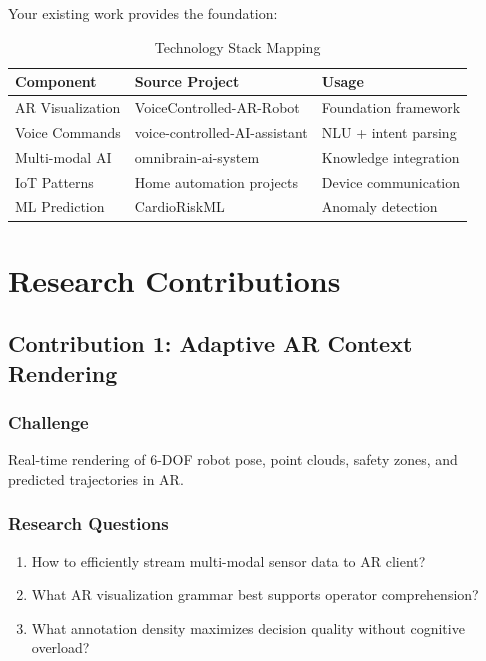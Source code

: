 \documentclass[12pt,a4paper,oneside]{book}
\begin{document}
Your existing work provides the foundation:

\begin{table}[H]
\centering
\begin{tabular}{|l|l|l|}
\hline
\textbf{Component} & \textbf{Source Project} & \textbf{Usage} \\
\hline
AR Visualization & VoiceControlled-AR-Robot & Foundation framework \\
Voice Commands & voice-controlled-AI-assistant & NLU + intent parsing \\
Multi-modal AI & omnibrain-ai-system & Knowledge integration \\
IoT Patterns & Home automation projects & Device communication \\
ML Prediction & CardioRiskML & Anomaly detection \\
\hline
\end{tabular}
\caption{Technology Stack Mapping}
\label{tab:tech_stack}
\end{table}

\newpage

\chapter{Research Contributions}

\section{Contribution 1: Adaptive AR Context Rendering}

\subsection{Challenge}
Real-time rendering of 6-DOF robot pose, point clouds, safety zones, and predicted trajectories in AR.

\subsection{Research Questions}
\begin{enumerate}
    \item How to efficiently stream multi-modal sensor data to AR client?
    \item What AR visualization grammar best supports operator comprehension?
    \item What annotation density maximizes decision quality without cognitive overload?
\end{enumerate}
\end{document}
